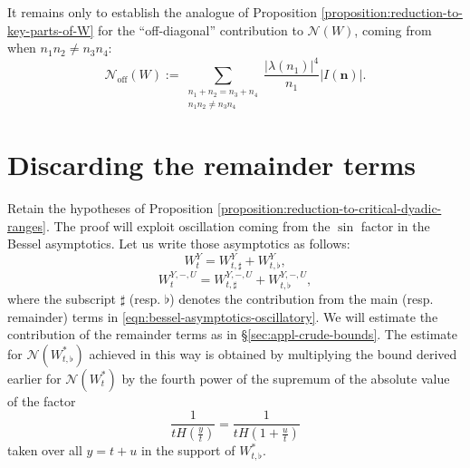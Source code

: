 \documentclass[reqno]{amsart} 
\begin{document}
It remains only to establish the analogue of Proposition \ref{proposition:reduction-to-key-parts-of-W} for the ``off-diagonal'' contribution to $\mathcal{N}(W)$, coming from when $n_1 n_2 \neq n_3 n_4$:
\begin{equation}\label{eqn:definition-N-off}
  \mathcal{N}_{\mathrm{off}}(W) := \sum _{
    \substack{
      n_1 + n_2 = n_3 + n_4  \\
      n_1 n_2 \neq n_3 n_4      
    }
  }
  \frac{\left\lvert \lambda (n _1 ) \right\rvert ^4 }{ n _1 } \left\lvert I(\mathbf{n}) \right\rvert.
\end{equation}


\section{Discarding the remainder terms}\label{sec:discarding-remainder-terms}
Retain the hypotheses of Proposition \ref{proposition:reduction-to-critical-dyadic-ranges}.  The proof will exploit oscillation coming from the $\sin$ factor in the Bessel asymptotics.  Let us write those asymptotics as follows:
\begin{equation*}
  W _t ^Y = W _{t,\sharp}^Y + W _{t,\flat}^Y,
\end{equation*}
\begin{equation*}
  W _t ^{Y, -, U} = W _{t, \sharp } ^{Y, -, U} + W _{t, \flat } ^{Y, -, U},
\end{equation*}
where the subscript $\sharp$ (resp. $\flat$) denotes the contribution from the main (resp. remainder) terms in \eqref{eqn:bessel-asymptotics-oscillatory}.  We will estimate the contribution of the remainder terms as in \S\ref{sec:appl-crude-bounds}.  The estimate for $\mathcal{N}(W_{t,\flat}^{\ast})$ achieved in this way is obtained by multiplying the bound derived earlier for $\mathcal{N} (W _{t} ^\ast )$ by the fourth power of the supremum of the absolute value of the factor
\begin{equation*}
  \frac{1}{t H (\tfrac{y}{t})} =   \frac{1}{t H (1 + \tfrac{u}{t})}
\end{equation*}
taken over all $y = t + u$ in the support of $W_{t,\flat}^*$.
\end{document}
